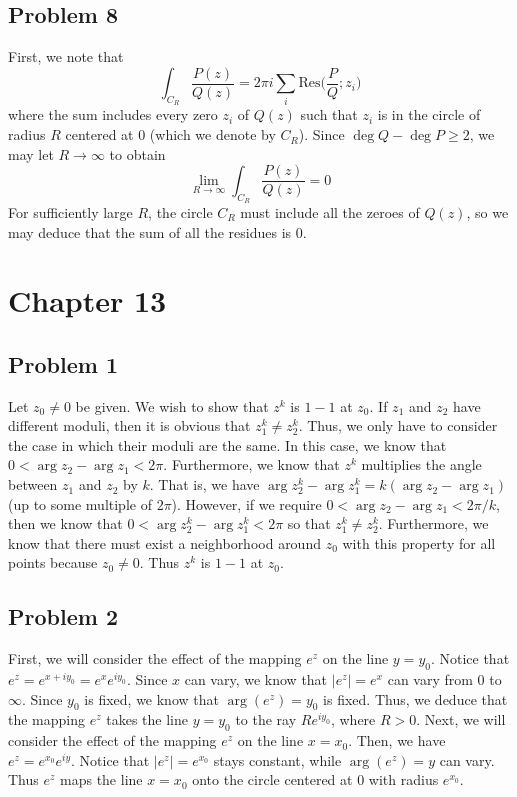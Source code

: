 \documentclass[12pt]{article}
\begin{document}
\subsection*{Problem 8}
First, we note that
\[
\int_{C_R} \frac{P(z)}{Q(z)} = 2\pi i \sum_i \text{Res}\bigg(\frac{P}{Q}; z_i\bigg)
\] where the sum includes every zero $z_i$ of $Q(z)$ such that $z_i$ is in the circle of radius $R$ centered at $0$ (which we denote by $C_R$). Since $\deg Q - \deg P \geq 2$, we may let $R \rightarrow \infty$ to obtain
\[
\lim_{R \rightarrow \infty}  \int_{C_R} \frac{P(z)}{Q(z)} = 0
\] For sufficiently large $R$, the circle $C_R$ must include all the zeroes of $Q(z)$, so we may deduce that the sum of all the residues is $0$.
\newpage
\section*{Chapter 13}
\subsection*{Problem 1}
Let $z_0 \neq 0$ be given. We wish to show that $z^k$ is $1-1$ at $z_0$. If $z_1$ and $z_2$ have different moduli, then it is obvious that $z_1^k \neq z_2^k$. Thus, we only have to consider the case in which their moduli are the same. In this case, we know that $0 < \arg z_2 - \arg z_1 < 2\pi$. Furthermore, we know that $z^k$ multiplies the angle between $z_1$ and $z_2$ by $k$. That is, we have $\arg z_2^k - \arg z_1^k = k(\arg z_2 - \arg z_1)$ (up to some multiple of $2 \pi$). However, if we require $0 < \arg z_2 - \arg z_1 < 2\pi/k$, then we know that $0<\arg z_2^k - \arg z_1^k < 2\pi$ so that $z_1^k \neq z_2^k$. Furthermore, we know that there must exist a neighborhood around $z_0$ with this property for all points because $z_0 \neq 0$. Thus $z^k$ is $1-1$ at $z_0$.
\newpage
\subsection*{Problem 2}
First, we will consider the effect of the mapping $e^z$ on the line $y = y_0$. Notice that $e^{z} = e^{x+iy_0} = e^x e^{iy_0}$. Since $x$ can vary, we know that $\vert e^z \vert = e^x$ can vary from $0$ to $\infty$. Since $y_0$ is fixed, we know that $\arg(e^z) = y_0$ is fixed. Thus, we deduce that the mapping $e^z$ takes the line $y=y_0$ to the ray $Re^{iy_0}$, where $R > 0$. Next, we will consider the effect of the mapping $e^z$ on the line $x = x_0$. Then, we have $e^z = e^{x_0} e^{iy}$. Notice that $\vert e^z \vert = e^{x_0}$ stays constant, while $\arg(e^z) = y$ can vary. Thus $e^{z}$ maps the line $x = x_0$ onto the circle centered at $0$ with radius $e^{x_0}$.
\newpage
\end{document}
